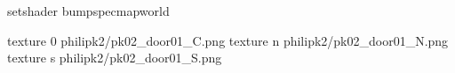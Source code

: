 setshader bumpspecmapworld

texture 0 philipk2/pk02_door01_C.png
texture n philipk2/pk02_door01_N.png
texture s philipk2/pk02_door01_S.png

